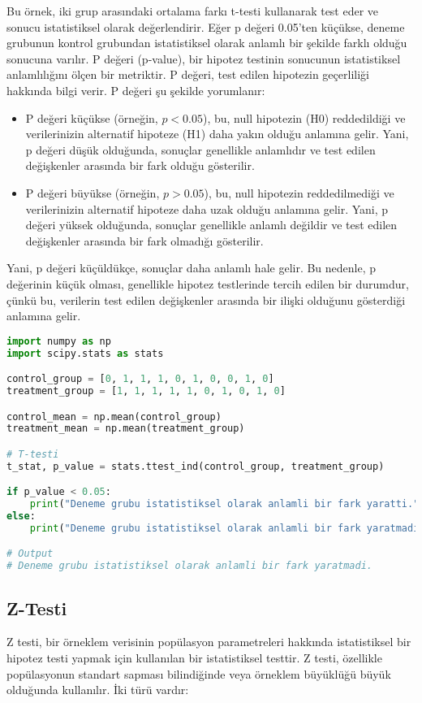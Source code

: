 Bu örnek, iki grup arasındaki ortalama farkı t-testi kullanarak test eder ve sonucu istatistiksel olarak değerlendirir. Eğer p değeri 0.05'ten küçükse, deneme grubunun kontrol grubundan istatistiksel olarak anlamlı bir şekilde farklı olduğu sonucuna varılır. P değeri (p-value), bir hipotez testinin sonucunun istatistiksel anlamlılığını ölçen bir metriktir. P değeri, test edilen hipotezin geçerliliği hakkında bilgi verir. P değeri şu şekilde yorumlanır:
\begin{itemize}
    \item P değeri küçükse (örneğin, $p < 0.05$), bu, null hipotezin (H0) reddedildiği ve verilerinizin alternatif hipoteze (H1) daha yakın olduğu anlamına gelir. Yani, p değeri düşük olduğunda, sonuçlar genellikle anlamlıdır ve test edilen değişkenler arasında bir fark olduğu gösterilir.
    \item P değeri büyükse (örneğin, $p > 0.05$), bu, null hipotezin reddedilmediği ve verilerinizin alternatif hipoteze daha uzak olduğu anlamına gelir. Yani, p değeri yüksek olduğunda, sonuçlar genellikle anlamlı değildir ve test edilen değişkenler arasında bir fark olmadığı gösterilir.
\end{itemize}

Yani, p değeri küçüldükçe, sonuçlar daha anlamlı hale gelir. Bu nedenle, p değerinin küçük olması, genellikle hipotez testlerinde tercih edilen bir durumdur, çünkü bu, verilerin test edilen değişkenler arasında bir ilişki olduğunu gösterdiği anlamına gelir.

\begin{lstlisting}[language=Python]
import numpy as np
import scipy.stats as stats

control_group = [0, 1, 1, 1, 0, 1, 0, 0, 1, 0]
treatment_group = [1, 1, 1, 1, 1, 0, 1, 0, 1, 0]

control_mean = np.mean(control_group)
treatment_mean = np.mean(treatment_group)

# T-testi
t_stat, p_value = stats.ttest_ind(control_group, treatment_group)

if p_value < 0.05:
    print("Deneme grubu istatistiksel olarak anlamli bir fark yaratti.")
else:
    print("Deneme grubu istatistiksel olarak anlamli bir fark yaratmadi.")

# Output
# Deneme grubu istatistiksel olarak anlamli bir fark yaratmadi.
\end{lstlisting}

\newpage

\subsection{Z-Testi}
Z testi, bir örneklem verisinin popülasyon parametreleri hakkında istatistiksel bir hipotez testi yapmak için kullanılan bir istatistiksel testtir. Z testi, özellikle popülasyonun standart sapması bilindiğinde veya örneklem büyüklüğü büyük olduğunda kullanılır. İki türü vardır:

